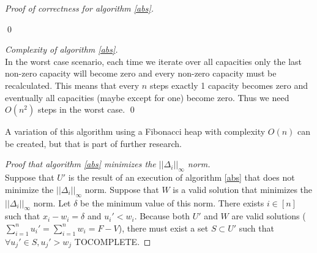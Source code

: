 \documentclass[11pt]{llncs}
\begin{document}
\begin{proof}[Proof of correctness for algorithm \ref{abs}]
\begin{itemize}
\begin{itemize}
          \end{itemize}
       \end{itemize}
       \qed
    \end{proof}
    \begin{proof}[Complexity of algorithm \ref{abs}] \ \\
       In the worst case scenario, each time we iterate over all capacities only the last non-zero capacity will become zero
       and every non-zero capacity must be recalculated. This means that every $n$ steps exactly 1 capacity becomes zero
       and eventually all capacities (maybe except for one) become zero. Thus we need $O(n^2)$ steps in the worst case. \qed
    \end{proof}
    A variation of this algorithm using a Fibonacci heap with complexity $O(n)$ can be created, but that is part of
    further research.
    \begin{proof}[Proof that algorithm \ref{abs} minimizes the $||\Delta_i||_\infty$ norm] \ \\
       Suppose that $U'$ is the result of an execution of algorithm \ref{abs} that does not minimize the $||\Delta_i||_\infty$
       norm. Suppose that $W$ is a valid solution that minimizes the $||\Delta_i||_\infty$ norm. Let $\delta$ be the minimum
       value of this norm. There exists $i \in [n]$ such that $x_i - w_i = \delta$ and $u_i' < w_i$. Because both $U'$
       and $W$ are valid solutions ($\sum\limits_{i=1}^{n}u_i' = \sum\limits_{i=1}^{n}w_i = F - V$), there must exist a set
       $S \subset U'$ such that $\forall u_j' \in S, u_j' > w_j$ TOCOMPLETE.
    \end{proof}
\end{document}
